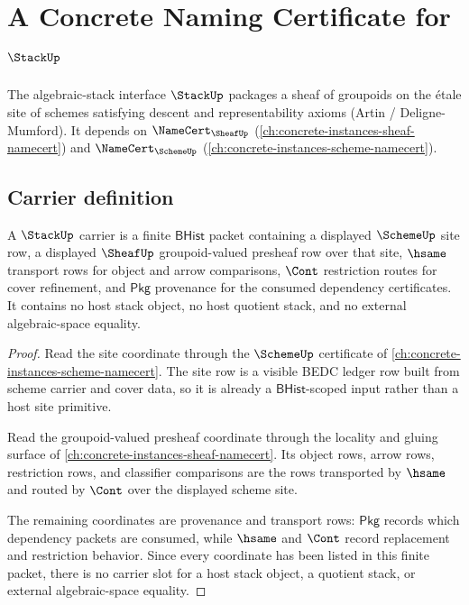 \chapter{A Concrete Naming Certificate for $\StackUp$}
\label{ch:concrete-instances-stack-namecert}

The algebraic-stack interface $\StackUp$ packages a sheaf of groupoids on the \'{e}tale site of schemes satisfying descent and representability axioms (Artin / Deligne-Mumford). It depends on $\NameCert_{\SheafUp}$ (\autoref{ch:concrete-instances-sheaf-namecert}) and $\NameCert_{\SchemeUp}$ (\autoref{ch:concrete-instances-scheme-namecert}).

\section{Carrier definition}
\label{sec:stack-carrier}

\begin{theorem}\label{thm:stack-carrier-obligation}
A $\StackUp$ carrier is a finite $\mathsf{BHist}$ packet containing a displayed $\SchemeUp$ site row, a displayed $\SheafUp$ groupoid-valued presheaf row over that site, $\hsame$ transport rows for object and arrow comparisons, $\Cont$ restriction routes for cover refinement, and $\mathsf{Pkg}$ provenance for the consumed dependency certificates. It contains no host stack object, no host quotient stack, and no external algebraic-space equality.
\end{theorem}
\begin{proof}
Read the site coordinate through the $\SchemeUp$ certificate of \autoref{ch:concrete-instances-scheme-namecert}. The site row is a visible BEDC ledger row built from scheme carrier and cover data, so it is already a $\mathsf{BHist}$-scoped input rather than a host site primitive.

Read the groupoid-valued presheaf coordinate through the locality and gluing surface of \autoref{ch:concrete-instances-sheaf-namecert}. Its object rows, arrow rows, restriction rows, and classifier comparisons are the rows transported by $\hsame$ and routed by $\Cont$ over the displayed scheme site.

The remaining coordinates are provenance and transport rows: $\mathsf{Pkg}$ records which dependency packets are consumed, while $\hsame$ and $\Cont$ record replacement and restriction behavior. Since every coordinate has been listed in this finite packet, there is no carrier slot for a host stack object, a quotient stack, or external algebraic-space equality.
\end{proof}

